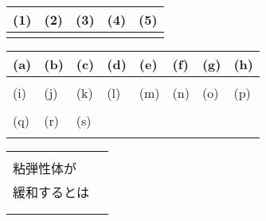 

\begin{table}[htb]
    \begin{center} 
      \begin{tabular}{|p{}|p{}|p{}|p{}|p{}|} \hline
        (1) & (2) & (3) & (4) & (5)\\ \hline \hline
          &  & & &  \\ \hline		
      \end{tabular}
    \end{center}
  \end{table}

  \begin{table}[htb]
    \begin{center} 
      \begin{tabular}{|p{}|p{}|p{}|p{}|p{}|p{}|p{}|p{}|} \hline
        (a) & (b) & (c) & (d) & (e) & (f) & (g) & (h)\\ \hline
          &  & & & & & &\\ \hline		
        (i) & (j) & (k) & (l) & (m) & (n) & (o) & (p)\\ \hline
        &  & & & & & &\\ \hline		
        (q) & (r) & (s) \\ \cline{1-3}
        &  & \\ \cline{1-3}
    \end{tabular}
    \end{center}
  \end{table}

\begin{table}[htb]
  \begin{center} 
    \begin{tabular}{|l|p{}|} \hline
      & \\
      粘弾性体が  & \\
      緩和するとは & \\ 
            & \\ 
      & \\ \hline
    \end{tabular}
  \end{center}
\end{table}


